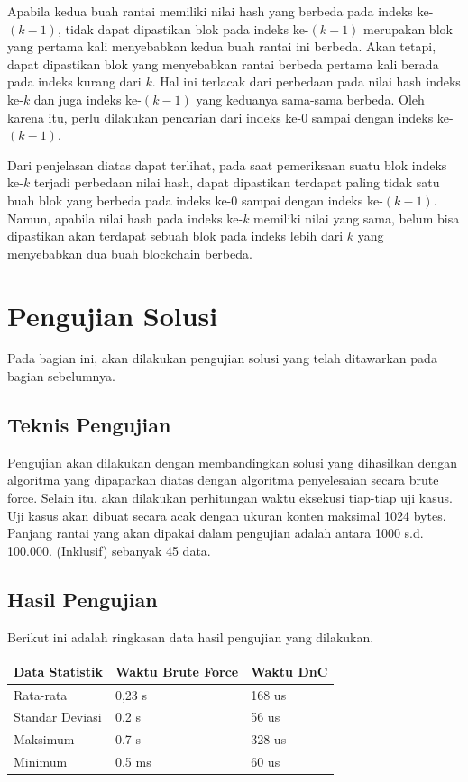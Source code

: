 \documentclass[10pt,conference]{IEEEtran}
\theoremstyle{definition}
\begin{document}
Apabila kedua buah rantai memiliki nilai hash yang berbeda pada indeks ke-$(k-1)$, tidak dapat dipastikan blok pada indeks ke-$(k-1)$ merupakan blok yang pertama kali menyebabkan kedua buah rantai ini berbeda. Akan tetapi, dapat dipastikan blok yang menyebabkan rantai berbeda pertama kali berada pada indeks kurang dari $k$. Hal ini terlacak dari perbedaan pada nilai hash indeks ke-$k$ dan juga indeks ke-$(k-1)$ yang keduanya sama-sama berbeda. Oleh karena itu, perlu dilakukan pencarian dari indeks ke-$0$ sampai dengan indeks ke-$(k-1)$.

Dari penjelasan diatas dapat terlihat, pada saat pemeriksaan suatu blok indeks ke-$k$ terjadi perbedaan nilai hash, dapat dipastikan terdapat paling tidak satu buah blok yang berbeda pada indeks ke-0 sampai dengan indeks ke-$(k-1)$. Namun, apabila nilai hash pada indeks ke-$k$ memiliki nilai yang sama, belum bisa dipastikan akan terdapat sebuah blok pada indeks lebih dari $k$ yang menyebabkan dua buah blockchain berbeda.

\section{Pengujian Solusi}
Pada bagian ini, akan dilakukan pengujian solusi yang telah ditawarkan pada bagian sebelumnya. 

\subsection{Teknis Pengujian}
Pengujian akan dilakukan dengan membandingkan solusi yang dihasilkan dengan algoritma yang dipaparkan diatas dengan algoritma penyelesaian secara brute force. Selain itu, akan dilakukan perhitungan waktu eksekusi tiap-tiap uji kasus. Uji kasus akan dibuat secara acak dengan ukuran konten maksimal 1024 bytes. Panjang rantai yang akan dipakai dalam pengujian adalah antara 1000 s.d. 100.000. (Inklusif) sebanyak 45 data.

\subsection{Hasil Pengujian}

Berikut ini adalah ringkasan data hasil pengujian yang dilakukan.
\vspace{8px}

\begin{tabular}{|l|l|l|}
\hline
\textbf{Data Statistik} & \textbf{Waktu Brute Force} & \textbf{Waktu DnC} \\ \hline
Rata-rata               & 0,23 s                     & 168 us             \\ \hline
Standar Deviasi         & 0.2 s                      & 56 us              \\ \hline
Maksimum                & 0.7 s                      & 328 us             \\ \hline
Minimum                 & 0.5 ms                     & 60 us              \\ \hline
\end{tabular}
\end{document}
